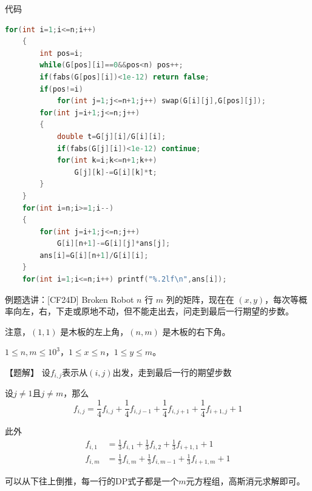 \documentclass{beamer}
\begin{document}
\begin{frame}[fragile]{代码}
    \begin{minipage}{\linewidth}
    \begin{lstlisting}[language=c++]
    for(int i=1;i<=n;i++)
    {
        int pos=i;
        while(G[pos][i]==0&&pos<n) pos++;
        if(fabs(G[pos][i])<1e-12) return false;
        if(pos!=i)
            for(int j=1;j<=n+1;j++) swap(G[i][j],G[pos][j]);
        for(int j=i+1;j<=n;j++)
        {
            double t=G[j][i]/G[i][i];
            if(fabs(G[j][i])<1e-12) continue;
            for(int k=i;k<=n+1;k++)
                G[j][k]-=G[i][k]*t;
        }
    }
    for(int i=n;i>=1;i--)
    {
        for(int j=i+1;j<=n;j++)
            G[i][n+1]-=G[i][j]*ans[j];
        ans[i]=G[i][n+1]/G[i][i];
    }
    for(int i=1;i<=n;i++) printf("%.2lf\n",ans[i]);
    \end{lstlisting}
    \end{minipage}
\end{frame}

\begin{frame}{例题选讲：[CF24D] Broken Robot}
    \small 
    $n$ 行 $m$ 列的矩阵，现在在 $(x,y)$，每次等概率向左，右，下走或原地不动，但不能走出去，问走到最后一行期望的步数。

    注意，$(1,1)$ 是木板的左上角，$(n,m)$ 是木板的右下角。

    $1\le n,m\le 10^3$，$1\le x\le n$，$1\le y\le m$。

    \vspace{1em}\pause
    【题解】 设$f_{i,j}$表示从$(i,j)$出发，走到最后一行的期望步数

    \vspace{.5em}
    \pause
    设$j\neq 1$且$j\neq m$，那么
    \begin{equation*}
        f_{i,j}=\frac{1}{4}f_{i,j}+\frac{1}{4}f_{i,j-1}+\frac{1}{4}f_{i,j+1}+\frac{1}{4}f_{i+1,j}+1
    \end{equation*}

    此外
    \begin{align*}
        f_{i,1}&=\frac{1}{3}f_{i,1}+\frac{1}{3}f_{i,2}+\frac{1}{3}f_{i+1,1}+1\\
        f_{i,m}&=\frac{1}{3}f_{i,m}+\frac{1}{3}f_{i,m-1}+\frac{1}{3}f_{i+1,m}+1
    \end{align*}

    \vspace{.5em}
    \pause
    可以从下往上倒推，每一行的DP式子都是一个$m$元方程组，高斯消元求解即可。
\end{frame}
\end{document}
